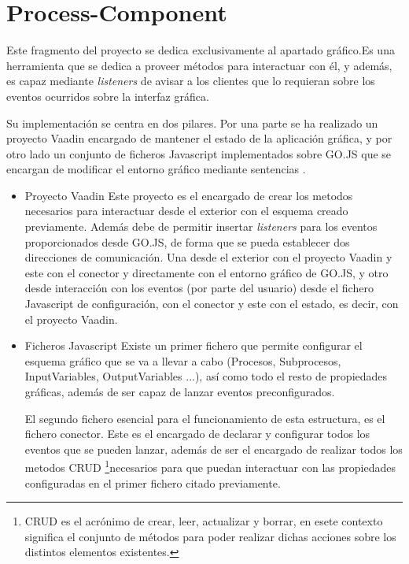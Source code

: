 \chapter{Process-Component}
	
	

Este fragmento del proyecto se dedica exclusivamente al apartado gráfico.Es una herramienta que se dedica a proveer métodos para interactuar con él, y además, es capaz mediante \emph{listeners} de avisar a los clientes que lo requieran sobre los eventos ocurridos sobre la interfaz gráfica.


Su implementación se centra en dos pilares. Por una parte se ha realizado un proyecto Vaadin encargado de mantener el estado de la aplicación gráfica, y por otro lado un conjunto de ficheros Javascript implementados sobre GO.JS que se encargan de modificar el entorno gráfico mediante sentencias .
\begin{itemize}
	\item Proyecto Vaadin
	\subitem Este proyecto es el encargado de crear los metodos necesarios para interactuar desde el exterior con el esquema creado previamente. Además debe de permitir insertar \emph{listeners} para los eventos proporcionados desde GO.JS, de forma que se pueda establecer dos direcciones de comunicación. Una desde el exterior con el proyecto Vaadin y este con el conector y directamente con el entorno gráfico de GO.JS, y otro desde interacción con los eventos (por parte del usuario) desde el fichero Javascript de configuración, con el conector y este con el estado, es decir, con el proyecto Vaadin.
	
	\item Ficheros Javascript
	\subitem Existe un primer fichero que permite configurar el esquema gráfico que se va a llevar a cabo (Procesos, Subprocesos, InputVariables, OutputVariables ...), así como todo el resto de propiedades gráficas, además de ser capaz de lanzar eventos preconfigurados.
	
	
	El segundo fichero esencial para el funcionamiento de esta estructura, es el fichero conector. Este es el encargado de declarar y configurar todos los eventos que se pueden lanzar, además de ser el encargado de realizar todos los metodos CRUD \footnote{CRUD es el acrónimo de crear, leer, actualizar y borrar, en esete contexto significa el conjunto de métodos para poder realizar dichas acciones sobre los distintos elementos existentes.}necesarios para que puedan interactuar con las propiedades configuradas en el primer fichero citado previamente.
\end{itemize}


